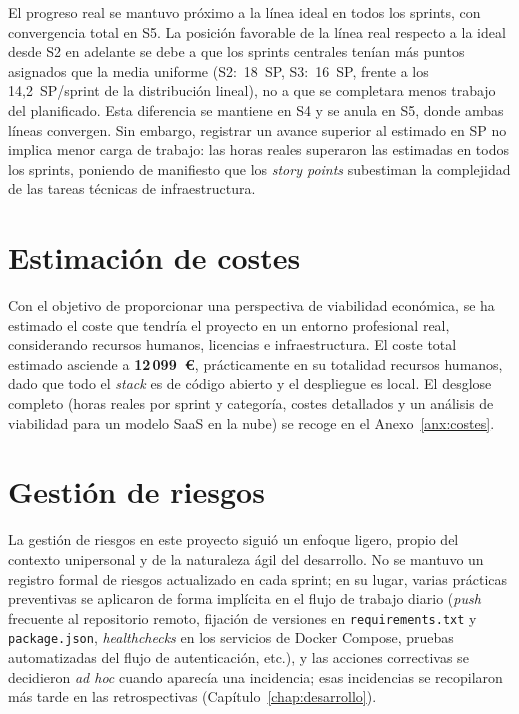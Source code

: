 El progreso real se mantuvo próximo a la línea ideal en todos los sprints,
con convergencia total en S5.  La posición favorable de la línea real
respecto a la ideal desde S2 en adelante se debe a que los sprints centrales
tenían más puntos asignados que la media uniforme (S2:~18~\ac{SP}, S3:~16~\ac{SP},
frente a los 14{,}2~\ac{SP}/sprint de la distribución lineal), no a que se
completara menos trabajo del planificado.  Esta diferencia se mantiene en S4
y se anula en S5, donde ambas líneas convergen.  Sin embargo, registrar un avance superior al estimado en \ac{SP} no implica
menor carga de trabajo: las horas reales superaron las
estimadas en todos los sprints, poniendo de manifiesto que los
\emph{story points} subestiman la complejidad de las tareas técnicas de
infraestructura.


\section{Estimación de costes}
\label{sec:costes}

Con el objetivo de proporcionar una perspectiva de viabilidad económica,
se ha estimado el coste que tendría el proyecto en un entorno profesional
real, considerando recursos humanos, licencias e infraestructura.  El coste
total estimado asciende a \textbf{12\,099~€}, prácticamente en su totalidad
recursos humanos, dado que todo el \emph{stack} es de código abierto y el
despliegue es local.  El desglose completo (horas reales por sprint y
categoría, costes detallados y un análisis de viabilidad para un modelo SaaS
en la nube) se recoge en el Anexo~\ref{anx:costes}.


\section{Gestión de riesgos}
\label{sec:riesgos}

La gestión de riesgos en este proyecto siguió un enfoque ligero,
propio del contexto unipersonal y de la naturaleza ágil del desarrollo.
No se mantuvo un registro formal de riesgos actualizado en cada sprint;
en su lugar, varias prácticas preventivas se aplicaron de forma
implícita en el flujo de trabajo diario (\emph{push} frecuente al
repositorio remoto, fijación de versiones en \texttt{requirements.txt}
y \texttt{package.json}, \emph{healthchecks} en los servicios de Docker
Compose, pruebas automatizadas del flujo de autenticación, etc.), y las
acciones correctivas se decidieron \emph{ad hoc} cuando aparecía una
incidencia; esas incidencias se recopilaron más tarde en las
retrospectivas (Capítulo~\ref{chap:desarrollo}).

